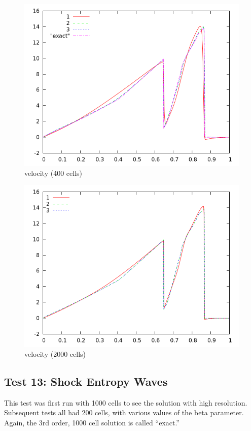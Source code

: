 \documentclass[10pt,preprint]{aastex}
\begin{document}
\begin{figure}[h]
  \begin{center}
     \includegraphics[width=.78\textwidth]{vel_T12_400.png}	
  \end{center}
  \caption{velocity (400 cells)}
\end{figure}

\begin{figure}[h]
  \begin{center}
     \includegraphics[width=.78\textwidth]{vel_T12_2000.png}	
  \end{center}
  \caption{velocity (2000 cells)}
\end{figure}

\clearpage

\subsection{Test 13: Shock Entropy Waves}

This test was first run with 1000 cells to see the solution with high resolution. Subsequent tests all had 200 cells, with various values of the beta parameter. Again, the 3rd order, 1000 cell solution is called ``exact.''
\end{document}
